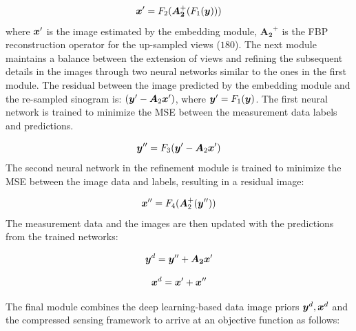 \begin{itemize}
\begin{equation}
\bm{x}^{\prime}=F_{2}(\bm{A_{2}}^{+}(F_{1} (\bm{y})))
\end{equation}
where $\bm{x}^{\prime}$ is the image estimated by the embedding module, $\bm{A_2}^{+}$ is the \ac{FBP} reconstruction operator for the up-sampled views ($180$). The next module maintains a balance between the extension of views and refining the subsequent details in the images through two neural networks similar to the ones in the first module. The residual between the image predicted by the embedding module and the re-sampled sinogram is: $(\bm{y}'-\bm{A}_{2} \bm{x}')$, where $\bm{y}'=F_{1}(\bm{y})$. The first neural network is trained to minimize the \ac{MSE} between the measurement data labels and predictions.   

\begin{equation}
\bm{y}'' = F_3(\bm{y}'-\bm{A}_{2} \bm{x}')
\end{equation} 
The second neural network in the refinement module is trained to minimize the \ac{MSE} between the image data and labels, resulting in a residual image:

\begin{equation}
\bm{x}'' = F_4(\bm{A}_{2}^{+}(\bm{y}''))
\end{equation} 
The measurement data and the images are then updated with the predictions from the trained networks:

\begin{equation}
\bm{y}^d = \bm{y}'' + \bm{A_{2}} \bm{x}' 
\end{equation}

\begin{equation}
\bm{x}^d = \bm{x}' + \bm{x}''
\end{equation}


The final module combines the deep learning-based data image priors ${\bm{y}^d,\bm{x}^d}$ and the compressed sensing framework to arrive at an objective function as follows:


\end{itemize}
